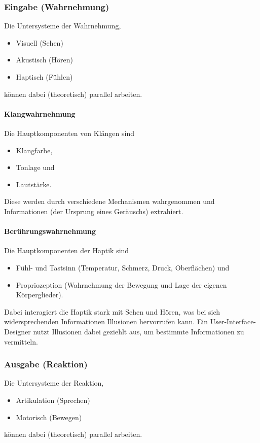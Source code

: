			\subsubsection{Eingabe (Wahrnehmung)}
				Die Untersysteme der Wahrnehmung,
				\begin{itemize}
					\item Visuell (Sehen)
					\item Akustisch (Hören)
					\item Haptisch (Fühlen)
				\end{itemize}
				können dabei (theoretisch) parallel arbeiten.
			
				\paragraph{Klangwahrnehmung}
					Die Hauptkomponenten von Klängen sind
					\begin{itemize}
						\item Klangfarbe,
						\item Tonlage und
						\item Lautstärke.
					\end{itemize}
					Diese werden durch verschiedene Mechanismen wahrgenommen und Informationen (\zB der Ursprung eines Geräuschs) extrahiert.

				\paragraph{Berührungswahrnehmung}
					Die Hauptkomponenten der Haptik sind
					\begin{itemize}
						\item Fühl- und Tastsinn (Temperatur, Schmerz, Druck, Oberflächen) und
						\item Propriozeption (Wahrnehmung der Bewegung und Lage der eigenen Körperglieder).
					\end{itemize}
					Dabei interagiert die Haptik stark mit Sehen und Hören, was bei sich widersprechenden Informationen Illusionen hervorrufen kann. Ein User-Interface-Designer nutzt Illusionen dabei geziehlt aus, um bestimmte Informationen zu vermitteln.

			\subsubsection{Ausgabe (Reaktion)}
				Die Untersysteme der Reaktion,
				\begin{itemize}
					\item Artikulation (Sprechen)
					\item Motorisch (Bewegen)
				\end{itemize}
				können dabei (theoretisch) parallel arbeiten.
				
